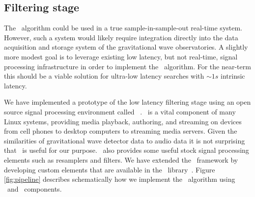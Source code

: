 \subsection{Filtering stage}

The \lloid\ algorithm could be used in a true sample-in-sample-out real-time
system.  However, such a system would likely require integration directly into
the data acquisition and storage system of the gravitational wave
observatories.  A slightly more modest goal is to leverage existing low
latency, but not real-time, signal processing infrastructure in order to
implement the \lloid\ algorithm.  For the near-term this should be a viable 
solution for ultra-low latency searches with $\sim 1s$ intrinsic latency.

We have implemented a prototype of the low latency filtering stage using an
open source signal processing environment called \gstreamer\ \cite{gstreamer}.
\gstreamer\ is a vital component of many Linux systems, providing media
playback, authoring, and streaming on devices from cell phones to desktop
computers to streaming media servers.  Given the similarities of gravitational
wave detector data to audio data it is not surprising that \gstreamer\ is
useful for our purpose. \gstreamer\ also provides some useful stock signal
processing elements such as resamplers and filters.  We have extended the
\gstreamer\ framework by developing custom elements that are available in the
\gstlal\ library~\cite{gstlal}.  Figure \ref{fig:pipeline} describes
schematically how we implement the \lloid\ algorithm using \gstlal\ and
\gstreamer\ components.
%
%
